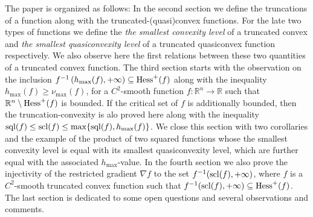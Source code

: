 \documentclass[12pt,twoside,reqno]{amsart}
\theoremstyle{definition}
\numberwithin{equation}{section}
\begin{document}
The paper is organized as follows: In the second section we define the truncations of a function along with the truncated-(quasi)convex functions. 
For the late two types of functions we define the {\em the smallest convexity level} of a truncated convex  and 
{\em the smallest quasiconvexity level} of a truncated quasiconvex function respectively. We also observe here the first relations between these two quantities of a 
truncated convex function. The third section starts with the observation on the inclusion $f^{-1}\left(h_{\max}(f),+\infty\right)\subseteq {\rm Hess}^+(f)$ 
along with the inequality $h_{\max}(f)\geq \nu_{\max}(f)$, for a $C^2$-smooth function $f:\mathbb{R}^n\longrightarrow\mathbb{R}$ such that 
$\mathbb{R}^n\setminus {\rm Hess}^+(f)$ is bounded. If  the critical set of $f$ is additionally bounded, then the truncation-convexity is alo proved here along with the 
inequality ${\rm sql}(f)\leq {\rm scl}(f)\leq \max\{{\rm sql}(f), h_{\max}(f)\}$. We close this section with two corollaries and the example of the product of two squared
functions whose the smallest convexity level is equal with its smallest quasiconvexity level, which are further equal with the associated $h_{\max}$-value. 
In the fourth section we also prove the injectivity of the restricted gradient $\nabla f$ to the set $f^{-1}({\rm scl}(f),+\infty)$, where $f$ is a
$C^2$-smooth truncated convex function such that $f^{-1}({\rm scl}(f),+\infty)\subseteq{\rm Hess}^+(f)$.
The last section is dedicated to some open questions and several observations and comments.
\end{document}
